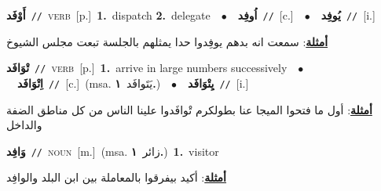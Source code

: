 \documentclass[10pt,a4paper,twoside]{article} %
\begin{document}
\begin{multicols}{2}
{\setlength\topsep{0pt}\textbf{\foreignlanguage{arabic}{أَوْفَد}}\ {\color{gray}\texttt{//}\color{black}}\ \textsc{verb}\ [p.]\ \textbf{1.}~dispatch  \textbf{2.}~delegate\ \ $\bullet$\ \ \setlength\topsep{0pt}\textbf{\foreignlanguage{arabic}{اُوفِد}}\ {\color{gray}\texttt{//}\color{black}}\ [c.]\ \ $\bullet$\ \ \setlength\topsep{0pt}\textbf{\foreignlanguage{arabic}{يُوفِد}}\ {\color{gray}\texttt{//}\color{black}}\ [i.]\  \begin{flushright}\color{gray}\foreignlanguage{arabic}{\textbf{\underline{\foreignlanguage{arabic}{أمثلة}}}: سمعت انه بدهم يوفِدوا حدا يمثلهم بالجلسة تبعت مجلس الشيوخ}\end{flushright}\color{black}} \vspace{2mm}

{\setlength\topsep{0pt}\textbf{\foreignlanguage{arabic}{تْوَافَد}}\ {\color{gray}\texttt{//}\color{black}}\ \textsc{verb}\ [p.]\ \textbf{1.}~arrive in large numbers successively\ \ $\bullet$\ \ \setlength\topsep{0pt}\textbf{\foreignlanguage{arabic}{اِتْوَافَد}}\ {\color{gray}\texttt{//}\color{black}}\ [c.]\ \color{gray}(msa. \foreignlanguage{arabic}{يَتَوافَد}~\foreignlanguage{arabic}{\textbf{١.}})\color{black}\ \ $\bullet$\ \ \setlength\topsep{0pt}\textbf{\foreignlanguage{arabic}{يِتْوَافَد}}\ {\color{gray}\texttt{//}\color{black}}\ [i.]\  \begin{flushright}\color{gray}\foreignlanguage{arabic}{\textbf{\underline{\foreignlanguage{arabic}{أمثلة}}}: أول ما فتحوا الميجا عنا بطولكرم تْوافَدوا علينا الناس من كل مناطق الضفة والداخل}\end{flushright}\color{black}} \vspace{2mm}

{\setlength\topsep{0pt}\textbf{\foreignlanguage{arabic}{وَافِد}}\ {\color{gray}\texttt{//}\color{black}}\ \textsc{noun}\ [m.]\ \color{gray}(msa. \foreignlanguage{arabic}{زائر}~\foreignlanguage{arabic}{\textbf{١.}})\color{black}\ \textbf{1.}~visitor\  \begin{flushright}\color{gray}\foreignlanguage{arabic}{\textbf{\underline{\foreignlanguage{arabic}{أمثلة}}}: أكيد بيفرقوا بالمعاملة بين ابن البلد والوافِد}\end{flushright}\color{black}} \vspace{2mm}


\end{multicols}
\end{document}
